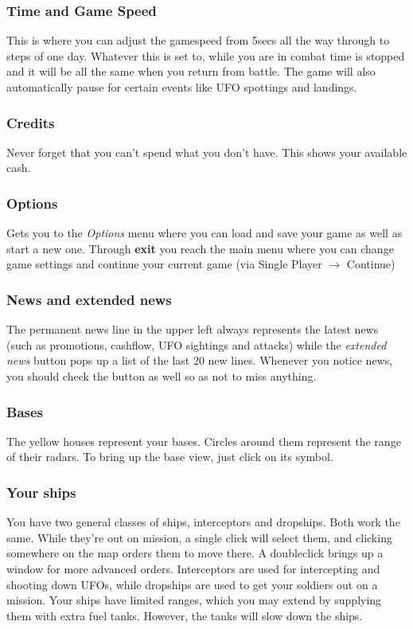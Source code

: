 \subsubsection{Time and Game Speed}
This is where you can adjust the gamespeed from 5secs all the way through to steps of one day. Whatever this is set to, while you are in combat time is stopped and it will be all the same when you return from battle.  The game will also automatically pause for certain events like UFO spottings and landings.

\subsubsection{Credits}
Never forget that you can't spend what you don't have.  This shows your available cash.

\subsubsection{Options}
Gets you to the \emph{Options} menu where you can load and save your game as well as start a new one.
Through \textbf{exit} you reach the main menu where you can change game settings and continue your current game (via Single Player $\rightarrow$ Continue)

\subsubsection{News and extended news}
The permanent news line in the upper left always represents the latest news (such as promotions, cashflow, UFO sightings and attacks) while the \emph{extended news} button pops up a list of the last 20 new lines.  Whenever you notice news, you should check the button as well so as not to miss anything. 

\subsubsection{Bases}
The yellow houses represent your bases. Circles around them represent the range of their radars. To bring up the base view, just click on its symbol.

\subsubsection{Your ships}
You have two general classes of ships, interceptors and dropships.  Both work the same.  While they're out on mission, a single click will select them, and clicking somewhere on the map orders them to move there.  A doubleclick brings up a window for more advanced orders.  Interceptors are used for intercepting and shooting down UFOs, while dropships are used to get your soldiers out on a mission.  Your ships have limited ranges, which you may extend by supplying them with extra fuel tanks.  However, the tanks will slow down the ships.

